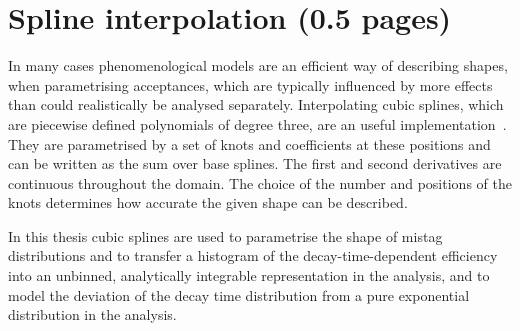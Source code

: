 
\section{Spline interpolation (0.5 pages)}
\label{sec:dataanalysis:splines}

In many cases phenomenological models are an efficient way of describing
shapes, \eg when parametrising acceptances, which are typically influenced by
more effects than could realistically be analysed separately. Interpolating
cubic splines, which are piecewise defined polynomials of degree three, are an
useful implementation~\cite{Splines}. They are parametrised by a set of knots
and coefficients at these positions and can be written as the sum over base
splines. The first and second derivatives are continuous throughout the
domain. The choice of the number and positions of the knots determines how
accurate the given shape can be described.

In this thesis cubic splines are used to parametrise the shape of mistag
distributions and to transfer a histogram of the decay-time-dependent
efficiency into an unbinned, analytically integrable representation in the
\BdToJPsiKS analysis, and to model the deviation of the decay time
distribution from a pure exponential distribution in the \BdToDD analysis.